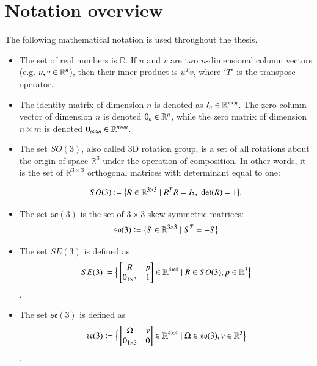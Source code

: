 \section{Notation overview}
The following mathematical notation is used throughout the thesis.
\begin{itemize}
    \item The set of real numbers is $\mathbb{R}$. If $u$ and $v$ are two $n$-dimensional column vectors (e.g. $u, v \in \mathbb{R}^{n}$), then their inner product is $u^Tv$, where $'T'$ is the transpose operator.
    \item The identity matrix of dimension $n$ is denoted as $I_{n} \in \mathbb{R}^{n\times n}$. The zero column vector of dimension $n$ is denoted $0_n \in \mathbb{R}^{n}$, while the zero matrix of dimension $n\times m$ is denoted $0_{n\times m} \in \mathbb{R}^{n\times m}$.
    \item The set $SO(3)$, also called 3D rotation group, is a set of all rotations about the origin of space $\mathbb{R}^3$ under the operation of composition. In other words, it is the set of $\mathbb{R}^{3\times 3}$ orthogonal matrices with determinant equal to one:

    \begin{equation}\label{def_SO3_group}
        SO(3) \vcentcolon= \big\{ R \in \mathbb{R}^{3\times 3} \;|\; R^TR = I_3,\; \text{det}(R) = 1 \big\}.
    \end{equation}

    \item The set $\mathfrak{so}(3)$ is the set of $3\times 3$ skew-symmetric matrices:
    \begin{equation}\label{def_so3_group}
        \mathfrak{so}(3) \vcentcolon= \big\{ S \in \mathbb{R}^{3\times 3} \;|\; S^T = -S \big\}
    \end{equation}

    \item The set $SE(3)$ is defined as
    \begin{equation}\label{def_SE3_group}
        SE(3) \vcentcolon= \Big\{ 
        \begin{bmatrix}
            R & p\\ 0_{1\times3} & 1
        \end{bmatrix} 
        \in \mathbb{R}^{4\times 4} \;|\; R\in SO(3), p\in \mathbb{R}^{3}
        \Big\}
    \end{equation}.

    \item The set $\mathfrak{se}(3)$ is defined as
    \begin{equation}\label{def_se3_group}
        \mathfrak{se}(3) \vcentcolon= \Big\{ 
        \begin{bmatrix}
            \Omega & v\\ 0_{1\times3} & 0
        \end{bmatrix} 
        \in \mathbb{R}^{4\times 4} \;|\; \Omega\in \mathfrak{so}(3), v\in \mathbb{R}^{3}
        \Big\}
    \end{equation}. 


\end{itemize}
